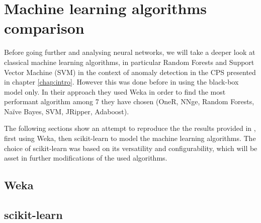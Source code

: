 \chapter{Machine learning algorithms comparison} \label{chap:methods}

Before going further and analysing neural networks, we will take a deeper look at classical machine learning algorithms, in particular Random Forests and Support Vector Machine (SVM) in the context of anomaly detection in the CPS presented in chapter \ref{chap:intro}. However this was done before in \cite{borges_hink_machine_2014-1} using the black-box model only. In their approach they used Weka \cite{witten_appendix_2017} in order to find the most performant algorithm among 7 they have chosen (OneR, NNge, Random Forests, Naïve Bayes, SVM, JRipper, Adaboost). 

The following sections show an attempt to reproduce the the results provided in \cite{borges_hink_machine_2014-1}, first using Weka, then scikit-learn \cite{pedregosa_scikit-learn_2011} to model the machine learning algorithms. The choice of scikit-learn was based on its versatility and configurability, which will be asset in further modifications of the used algorithms.

\section{Weka}

\section{scikit-learn}